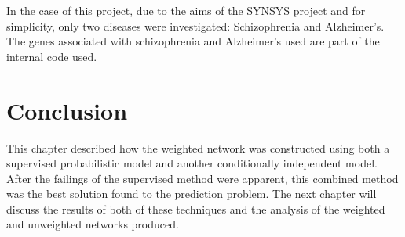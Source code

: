 
In the case of this project, due to the aims of the SYNSYS\autocite{synsys} project and for simplicity, only two diseases were investigated: Schizophrenia and Alzheimer's.
The genes associated with schizophrenia and Alzheimer's used are part of the internal code used.


\section*{Conclusion}

This chapter described how the weighted network was constructed using both a supervised probabilistic model and another conditionally independent model.
After the failings of the supervised method were apparent, this combined method was the best solution found to the prediction problem.
The next chapter will discuss the results of both of these techniques and the analysis of the weighted and unweighted networks produced.
